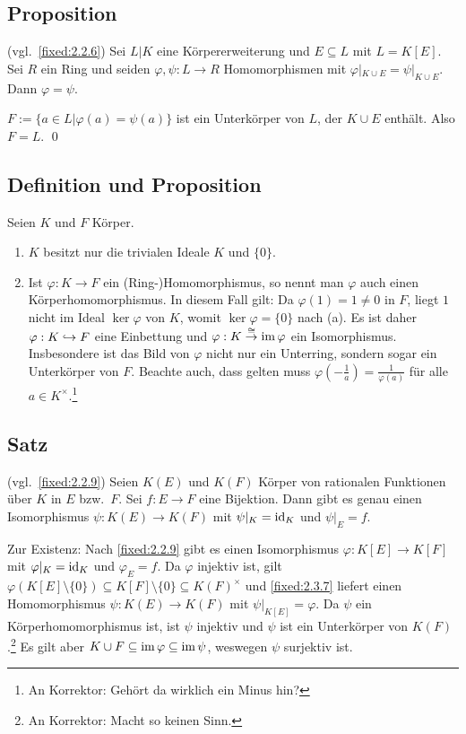 \subsection{Proposition} \label{fixed:2.3.13} (vgl.~\ref{fixed:2.2.6}) Sei $L|K$ eine Körpererweiterung und $E \subseteq L$ mit $L = K[E]$. Sei $R$ ein Ring und seiden $\varphi, \psi: L \to R$ Homomorphismen mit $\varphi|_{K \cup E} = \psi|_{K \cup E}$. Dann $\varphi = \psi$.

\proof $F := \{a \in L | \varphi(a) = \psi(a)\}$ ist ein Unterkörper von $L$, der $K \cup E$ enthält. Also $F = L$. \qed

\subsection{Definition und Proposition} Seien $K$ und $F$ Körper.
\begin{enumerate}[label=(\alph*)]
	\item
		$K$ besitzt nur die trivialen Ideale $K$ und $\{0\}$.
	\item
		Ist $\varphi: K \to F$ ein (Ring-)Homomorphismus, so nennt man $\varphi$ auch einen Körperhomomorphismus. In diesem Fall gilt: Da $\varphi(1) = 1 \neq 0$ in $F$, liegt $1$ nicht im Ideal $\ker \varphi$ von $K$, womit $\ker \varphi = \{0\}$ nach (a). Es ist daher $\varphi : K \MAPmono F$ eine Einbettung und $\varphi : K \overset{\cong}{\rightarrow} \operatorname{im} \varphi$ ein Isomorphismus. Insbesondere ist das Bild von $\varphi$ nicht nur ein Unterring, sondern sogar ein Unterkörper von $F$. Beachte auch, dass gelten muss $\varphi\left(-\frac{1}{a}\right) = \frac{1}{\varphi(a)}$ für alle $a \in K^\times$.\footnote{An Korrektor: Gehört da wirklich ein Minus hin?}
\end{enumerate}

\subsection{Satz} (vgl.~\ref{fixed:2.2.9}) Seien $K(E)$ und $K(F)$ Körper von rationalen Funktionen über $K$ in $E$ bzw.~$F$. Sei $f: E \to F$ eine Bijektion. Dann gibt es genau einen Isomorphismus $\psi: K(E) \to K(F)$ mit $\psi|_K = \operatorname{id}_K$ und $\psi|_E = f$.

\proof Zur Existenz: Nach \ref{fixed:2.2.9} gibt es einen Isomorphismus $\varphi: K[E] \to K[F]$ mit $\varphi|_K = \operatorname{id}_K$ und $\varphi_E = f$. Da $\varphi$ injektiv ist, gilt $\varphi(K[E]\setminus\{0\}) \subseteq K[F]\setminus\{0\} \subseteq K(F)^\times$ und \ref{fixed:2.3.7} liefert einen Homomorphismus $\psi : K(E) \to K(F)$ mit $\psi|_{K[E]} = \varphi$. Da $\psi$ ein Körperhomomorphismus ist, ist $\psi$ injektiv und $\psi$ ist ein Unterkörper von $K(F)$.\footnote{An Korrektor: Macht so keinen Sinn.} Es gilt aber $K \cup F \subseteq \operatorname{im} \varphi \subseteq \operatorname{im} \psi$, weswegen $\psi$ surjektiv ist.

